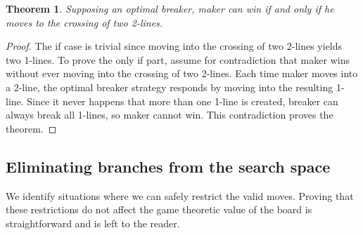 \documentclass[conference]{IEEEtran}
\newtheorem{theorem}{Theorem}[section]
\theoremstyle{definition}
\begin{document}
\begin{theorem} 
\label{maker_win_condition}
Supposing an optimal breaker, maker can win if and only if he moves to the crossing of two 2-lines.
\end{theorem}

\begin{proof}
The if case is trivial since moving into the crossing of two 2-lines yields two 1-lines. To prove the only if part, assume for contradiction that maker wins without ever moving into the crossing of two 2-lines. Each time maker moves into a 2-line, the optimal breaker strategy responds by moving into the resulting 1-line. Since it never happens that more than one 1-line is created, breaker can always break all 1-lines, so maker cannot win. This contradiction proves the theorem.
\end{proof}

\subsection{Eliminating branches from the search space}
We identify situations where we can safely restrict the valid moves. Proving that these restrictions do not affect the game theoretic value of the board is straightforward and is left to the reader.
\end{document}
